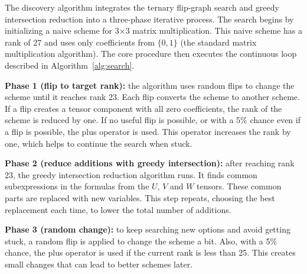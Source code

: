\documentclass{article}
\begin{document}
The discovery algorithm integrates the ternary flip-graph search and greedy intersection reduction into a three-phase iterative process. The search begins by initializing a naive scheme for 3×3 matrix multiplication. This naive scheme has a rank of 27 and uses only coefficients from $\{0, 1\}$ (the standard matrix multiplication algorithm). The core procedure then executes the continuous loop described in Algorithm~\ref{alg:search}.

\begin{algorithm}[H]
\caption{Search loop for low-addition schemes}
\label{alg:search}
\BlankLine
{}
\end{algorithm}

\textbf{Phase 1 (flip to target rank):} the algorithm uses random flips to change the scheme until it reaches rank 23. Each flip converts the scheme to another scheme. If a flip creates a tensor component with all zero coefficients, the rank of the scheme is reduced by one. If no useful flip is possible, or with a 5\% chance even if a flip is possible, the plus operator is used. This operator increases the rank by one, which helps to continue the search when stuck.

\textbf{Phase 2 (reduce additions with greedy intersection):} after reaching rank 23, the greedy intersection reduction algorithm runs. It finds common subexpressions in the formulas from the $U$, $V$ and $W$ tensors. These common parts are replaced with new variables. This step repeats, choosing the best replacement each time, to lower the total number of additions.

\textbf{Phase 3 (random change):} to keep searching new options and avoid getting stuck, a random flip is applied to change the scheme a bit. Also, with a 5\% chance, the plus operator is used if the current rank is less than 25. This creates small changes that can lead to better schemes later.
\end{document}
